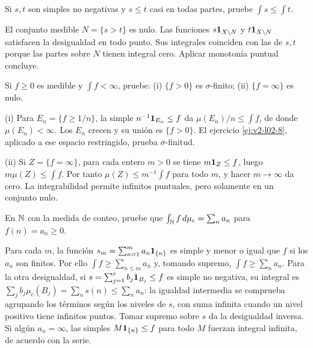 \begin{ejercicio}\label{ej:v2-l08-2}
Si $s,t$ son simples no negativas y $s\le t$ casi en todas partes, pruebe $\int s\le\int t$.
\end{ejercicio}
\begin{solucion}
El conjunto medible $N=\{s>t\}$ es nulo. Las funciones $s\mathbf1_{X\setminus N}$ y $t\mathbf1_{X\setminus N}$ satisfacen la desigualdad en todo punto. Sus integrales coinciden con las de $s,t$ porque las partes sobre $N$ tienen integral cero. Aplicar monotonía puntual concluye.
\end{solucion}

\begin{ejercicio}\label{ej:v2-l08-3}
Si $f\ge0$ es medible y $\int f<\infty$, pruebe: (i) $\{f>0\}$ es $\sigma$-finito; (ii) $\{f=\infty\}$ es nulo.
\end{ejercicio}
\begin{solucion}
(i) Para $E_n=\{f\ge1/n\}$, la simple $n^{-1}\mathbf1_{E_n}\le f$ da $\mu(E_n)/n\le\int f$, de donde $\mu(E_n)<\infty$. Los $E_n$ crecen y su unión es $\{f>0\}$. El ejercicio \ref{ej:v2-l02-8}, aplicado a ese espacio restringido, prueba $\sigma$-finitud.

(ii) Si $Z=\{f=\infty\}$, para cada entero $m>0$ se tiene $m\mathbf1_{Z}\le f$, luego $m\mu(Z)\le\int f$. Por tanto $\mu(Z)\le m^{-1}\int f$ para todo $m$, y hacer $m\to\infty$ da cero. La integrabilidad permite infinitos puntuales, pero solamente en un conjunto nulo.
\end{solucion}

\begin{ejercicio}\label{ej:v2-l08-4}
En $\mathbb N$ con la medida de conteo, pruebe que $\int_\mathbb N f\,d\mu_c=\sum_na_n$ para $f(n)=a_n\ge0$.
\end{ejercicio}
\begin{solucion}
Para cada $m$, la función $s_m=\sum_{n=1}^ma_n\mathbf1_{\{n\}}$ es simple y menor o igual que $f$ si los $a_n$ son finitos. Por ello $\int f\ge\sum_{n\le m}a_n$ y, tomando supremo, $\int f\ge\sum_na_n$. Para la otra desigualdad, si $s=\sum_{j=1}^rb_j\mathbf1_{B_j}\le f$ es simple no negativa, su integral es $\sum_jb_j\mu_c(B_j)=\sum_ns(n)\le\sum_na_n$: la igualdad intermedia se comprueba agrupando los términos según los niveles de $s$, con suma infinita cuando un nivel positivo tiene infinitos puntos. Tomar supremo sobre $s$ da la desigualdad inversa. Si algún $a_n=\infty$, las simples $M\mathbf1_{\{n\}}\le f$ para todo $M$ fuerzan integral infinita, de acuerdo con la serie.
\end{solucion}

